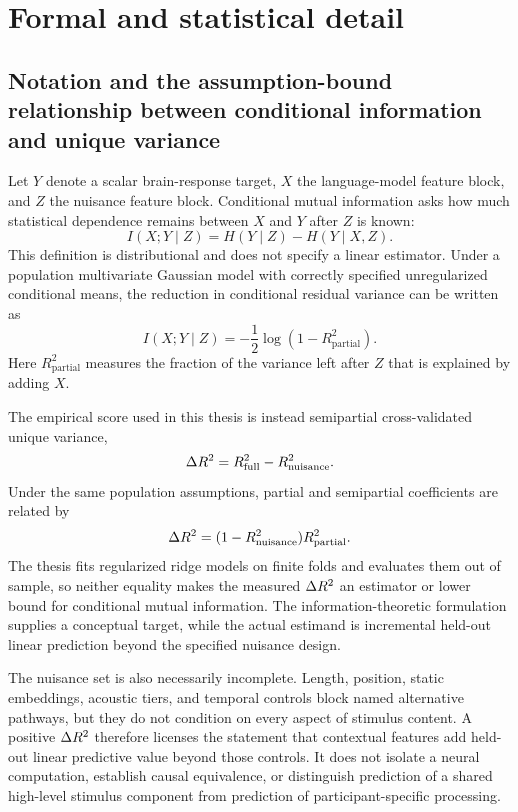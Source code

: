 \section{Formal and statistical detail}
\label{app:formal}

\subsection{Notation and the assumption-bound relationship between conditional information and unique variance}
\label{sec:cmi-detail}

Let $Y$ denote a scalar brain-response target, $X$ the language-model feature block, and $Z$ the nuisance feature block.
Conditional mutual information asks how much statistical dependence remains between $X$ and $Y$ after $Z$ is known:
\begin{equation}
I(X;Y\mid Z)=H(Y\mid Z)-H(Y\mid X,Z).
\end{equation}
This definition is distributional and does not specify a linear estimator.
Under a population multivariate Gaussian model with correctly specified unregularized conditional means, the reduction in conditional residual variance can be written as
\begin{equation}
I(X;Y\mid Z)=-\frac{1}{2}\log\left(1-R^2_{\mathrm{partial}}\right).
\end{equation}
Here $R^2_{\mathrm{partial}}$ measures the fraction of the variance left after $Z$ that is explained by adding $X$.

The empirical score used in this thesis is instead semipartial cross-validated unique variance,
\begin{equation}
\Delta R^2=R^2_{\mathrm{full}}-R^2_{\mathrm{nuisance}}.
\end{equation}
Under the same population assumptions, partial and semipartial coefficients are related by
\begin{equation}
\Delta R^2=(1-R^2_{\mathrm{nuisance}})R^2_{\mathrm{partial}}.
\end{equation}
The thesis fits regularized ridge models on finite folds and evaluates them out of sample, so neither equality makes the measured $\Delta R^2$ an estimator or lower bound for conditional mutual information.
The information-theoretic formulation supplies a conceptual target, while the actual estimand is incremental held-out linear prediction beyond the specified nuisance design.

The nuisance set is also necessarily incomplete.
Length, position, static embeddings, acoustic tiers, and temporal controls block named alternative pathways, but they do not condition on every aspect of stimulus content.
A positive $\Delta R^2$ therefore licenses the statement that contextual features add held-out linear predictive value beyond those controls.
It does not isolate a neural computation, establish causal equivalence, or distinguish prediction of a shared high-level stimulus component from prediction of participant-specific processing.

